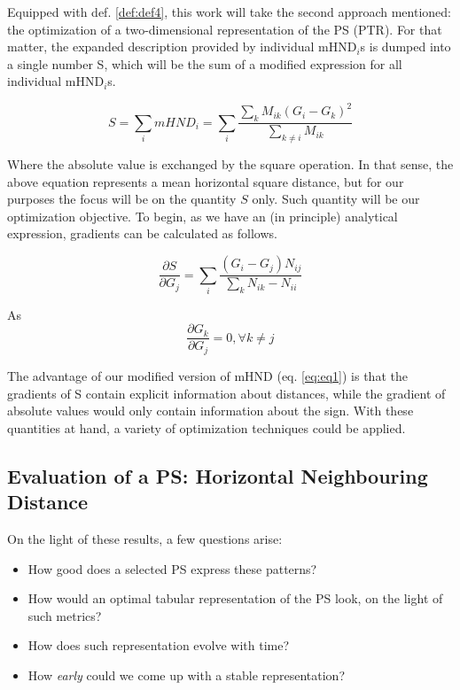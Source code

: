 \documentclass[article]{article}
\begin{document}
Equipped with def. \ref{def:def4}, this work will take the second approach mentioned: the optimization of a two-dimensional representation of the PS (PTR). For that matter, the expanded description provided by individual mHND$_i$s is dumped into a single number S, which will be the sum of a modified expression for all individual mHND$_i$s.

\begin{equation}
\label{eq:eq1}
	S = \sum_i mHND_i = \sum_i \frac{\sum_k M_{ik} (G_i - G_k)^2}{\sum_{k \neq i} M_{ik}}
\end{equation}

Where the absolute value is exchanged by the square operation. In that sense, the above equation represents a mean horizontal square distance, but for our purposes the focus will be on the quantity $S$ only. Such quantity will be our optimization objective. To begin, as we have an (in principle) analytical expression, gradients can be calculated as follows.

\begin{equation}
\frac{\partial S}{\partial G_j} = \sum_i \frac{ ( G_i - G_j ) N_{ij} }{\sum_k N_{ik} - N_{ii}}
\end{equation}

As \\
$$
\frac{\partial G_{k}}{\partial G_j} = 0, \forall k \neq j
$$

The advantage of our modified version of mHND (eq. \ref{eq:eq1}) is that the gradients of S contain explicit information about distances, while the gradient of absolute values would only contain information about the sign. With these quantities at hand, a variety of optimization techniques could be applied. \\


\subsection{Evaluation of a PS: Horizontal Neighbouring Distance}


On the light of these results, a few questions arise:
\begin{itemize}
	\item How good does a selected PS express these patterns? 
	\item How would an optimal tabular representation of the PS look, on the light of such metrics?
	\item How does such representation evolve with time?
	\item How \textit{early} could we come up with a stable representation?
\end{itemize}
\end{document}
